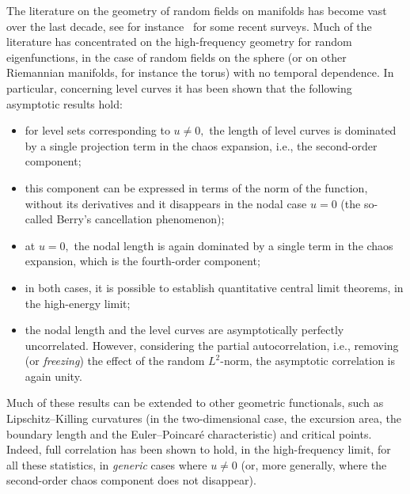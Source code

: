 \documentclass[10pt]{amsart}
\theoremstyle{definition}\newtheorem{defi}[theo]{Definition}\newtheorem{rema}[theo]{Remark}\newtheorem{exam}[theo]{Example}\newtheorem{exem}[theo]{Example}\newtheorem{nota}[theo]{Notation}
\begin{document}
The literature on the geometry of random fields on manifolds has become vast over the last decade, see for instance~\cite{M2022,Rossi2018,Wig22} for some recent surveys. Much of the literature has concentrated on the high-frequency geometry for random eigenfunctions, in the case of random fields on the sphere (or on other Riemannian manifolds, for instance the torus) with no temporal dependence. In particular, concerning level curves it has been shown that the following asymptotic results hold:
\begin{itemize}
\item for level sets corresponding to $u\neq 0,$ the length of level curves is dominated by a single projection term in the chaos expansion, i.e., the second-order component;

\item this component can be expressed in terms of the norm of the function, without its derivatives and it disappears in the nodal case $u=0$ (the so-called Berry's cancellation phenomenon);

\item at $u=0,$ the nodal length is again dominated by a single term in the chaos expansion, which is the fourth-order component;

\item in both cases, it is possible to establish quantitative central limit theorems, in the high-energy limit;

\item the nodal length and the level curves are asymptotically perfectly uncorrelated. However, considering the partial autocorrelation, i.e., removing (or \emph{freezing}) the effect of the random $L^{2}$-norm, the asymptotic correlation is again unity.
\end{itemize}

Much of these results can be extended to other geometric functionals, such as Lipschitz--Killing curvatures (in the two-dimensional case, the excursion area, the boundary length and the Euler--Poincaré characteristic) and critical points. Indeed, full correlation has been shown to hold, in the high-frequency limit, for all these statistics, in \emph{generic} cases where $u\neq 0$ (or, more generally, where the second-order chaos component does not disappear).
\end{document}
